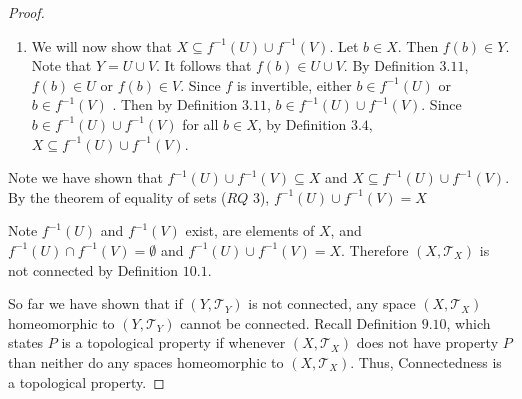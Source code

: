 \documentclass[12pt,titlepage]{extarticle}
\begin{document}
\begin{proof}
\begin{enumerate}
\begin{enumerate}[label=\alph*)]
        \item We will now show that $X \subseteq f^{-1}(U)\cup f^{-1}(V)$. Let $b\in X$. Then $f(b)\in Y$.  Note that $Y=U\cup V$. It follows that $f(b)\in U\cup V$. By Definition $3.11$,  $f(b)\in U$ or $f(b)\in V$. Since $f$ is invertible, either $b\in f^{-1}(U)$ or $b\in f^{-1}(V)$ . Then by Definition $3.11$, $b\in f^{-1}(U)\cup f^{-1}(V)$. Since $b\in f^{-1}(U)\cup f^{-1}(V)$ for all $b\in X$, by Definition $3.4$, $X\subseteq f^{-1}(U)\cup f^{-1}(V)$.
    \end{enumerate}
    Note we have shown that $f^{-1}(U)\cup f^{-1}(V)\subseteq X$ and $X\subseteq f^{-1}(U)\cup f^{-1}(V)$. By the theorem of equality of sets ($RQ$ $3$), $f^{-1}(U)\cup f^{-1}(V)=X$
\end{enumerate}

Note $f^{-1}(U)$ and $f^{-1}(V)$ exist, are elements of $X$, and $f^{-1}(U)\cap f^{-1}(V)=\emptyset$ and $f^{-1}(U)\cup f^{-1}(V)=X$. Therefore $(X,\mathcal{T}_X)$ is not connected by Definition $10.1$.

So far we have shown that if $(Y,\mathcal{T}_Y)$ is not connected, any space $(X,\mathcal{T}_X)$ homeomorphic to $(Y,\mathcal{T}_Y)$ cannot be connected. Recall Definition $9.10$, which states $P$ is a topological property if whenever $(X,\mathcal{T}_X)$ does not have property $P$ than neither do any spaces homeomorphic to $(X,\mathcal{T}_X)$. Thus, Connectedness is a topological property.
\end{proof}
\end{document}

